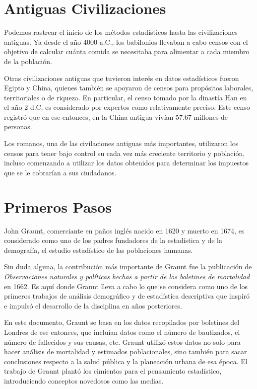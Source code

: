 \documentclass[12pt, a4paper]{article}
\begin{document}
\section{Antiguas Civilizaciones}

Podemos rastrear el inicio de los métodos estadísticos hasta las civilizaciones antiguas. Ya desde el año 4000 a.C., los babilonios llevaban a cabo censos con el objetivo de calcular cuánta comida se necesitaba para alimentar a cada miembro de la población.

Otras civilizaciones antiguas que tuvieron interés en datos estadísticos fueron Egipto y China, quienes también se apoyaron de censos para propósitos laborales, territoriales o de riqueza. En particular, el censo tomado por la dinastía Han en el año 2 d.C. es considerado por expertos como relativamente preciso. Este censo registró que en ese entonces, en la China antigua vivían 57.67 millones de personas.

Los romanos, una de las civilaciones antiguas más importantes, utilizaron los censos para tener bajo control su cada vez más creciente territorio y población, incluso comenzando a utilizar los datos obtenidos para determinar los impuestos que se le cobrarían a sus ciudadanos.

\section{Primeros Pasos}

John Graunt, comerciante en paños inglés nacido en 1620 y muerto en 1674, es considerado como uno de los padres fundadores de la estadística y de la demografía, el estudio estadístico de las poblaciones humanas.

Sin duda alguna, la contribución más importante de Graunt fue la publicación de \textit{Observaciones naturales y políticas hechas a partir de los boletines de mortalidad} en 1662. Es aquí donde Graunt lleva a cabo lo que se considera como uno de los primeros trabajos de análisis demográfico y de estadística descriptiva que inspiró e impulsó el desarrollo de la disciplina en años posteriores.

En este documento, Graunt se basa en los datos recopilados por boletines del Londres de ese entonces, que incluían datos como el número de bautizados, el número de fallecidos y sus causas, etc. Graunt utilizó estos datos no solo para hacer análisis de mortalidad y estimados poblacionales, sino también para	sacar conclusiones respecto a la salud pública y la planeación urbana de esa época. El trabajo de Graunt plantó los cimientos para el pensamiento estadístico, introduciendo conceptos novedosos como las medias.
\end{document}
